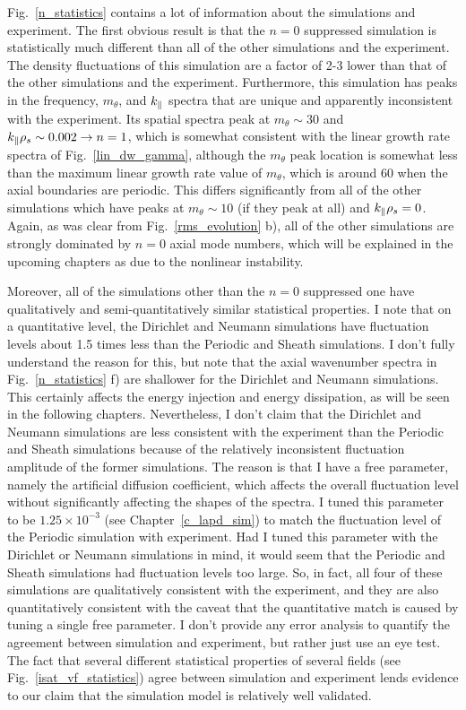 Fig.~\ref{n_statistics} contains a lot of information about the simulations and experiment. The first obvious result is that the $n=0$ suppressed simulation is statistically much different
than all of the other simulations and the experiment. The density fluctuations of this simulation are a factor of 2-3 lower than that of the other simulations and the experiment.
Furthermore, this simulation has peaks in the frequency, $m_\theta$, and $k_\parallel$ spectra that are unique and apparently inconsistent with the experiment. Its spatial spectra peak at
$m_\theta \sim 30$ and $k_\parallel \rho_s \sim 0.002 \rightarrow n = 1$, which is somewhat consistent with the linear growth rate spectra of Fig.~\ref{lin_dw_gamma}, although the $m_\theta$
peak location is somewhat less than the maximum linear growth rate value of $m_\theta$, which is around 60 when the axial boundaries are periodic. 
This differs significantly from all of the other simulations which have peaks at $m_\theta \sim 10$ (if they peak at all)
and $k_\parallel \rho_s = 0$. Again, as was clear from Fig.~\ref{rms_evolution} b), all of the other simulations are strongly dominated by $n=0$ axial mode numbers, which will be explained
in the upcoming chapters as due to the nonlinear instability.

Moreover, all of the simulations other than the $n=0$ suppressed one have qualitatively and semi-quantitatively similar statistical properties. I note that on a quantitative level,
the Dirichlet and Neumann simulations have fluctuation levels about 1.5 times less than the Periodic and Sheath simulations. I don't fully understand the reason for this, but note
that the axial wavenumber spectra in Fig.~\ref{n_statistics} f) are shallower for the Dirichlet and Neumann simulations. This certainly affects the energy injection and energy
dissipation, as will be seen in the following chapters. Nevertheless, I don't claim that the Dirichlet and Neumann simulations are less consistent with the experiment than the
Periodic and Sheath simulations because of the relatively inconsistent fluctuation amplitude of the former simulations. The reason is that I have a free parameter, namely the artificial
diffusion coefficient, which affects the overall fluctuation level without significantly affecting the shapes of the spectra. I tuned this parameter to be 
$1.25 \times 10^{-3}$ (see Chapter~\ref{c_lapd_sim})
to match the fluctuation level of the Periodic simulation with experiment. Had I tuned this parameter with the Dirichlet or Neumann simulations in mind, it would seem that
the Periodic and Sheath simulations had fluctuation levels too large. So, in fact, all four of these simulations are qualitatively consistent with the experiment, and they are also
quantitatively consistent with the caveat that the quantitative match is caused by tuning a single free parameter. I don't provide any error analysis to quantify the agreement
between simulation and experiment, but rather just use an eye test. The fact that several different statistical properties of several fields (see Fig.~\ref{isat_vf_statistics})
agree between simulation and experiment lends evidence to our claim that the simulation model is relatively well validated.


